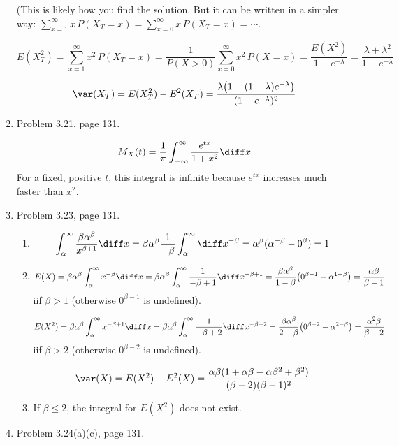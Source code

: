 \documentclass[12pt]{article}
\begin{document}
\begin{enumerate}
(This is likely how you find the solution.
But it can be written in a simpler way:
$\sum_{x=1}^{\infty} x\, P(X_T = x)
= \sum_{x=0}^{\infty} x\, P(X_T = x)
= \dotsb$.

\[
E(X_T^2)
= \sum_{x=1}^{\infty} x^2\, P(X_T = x)
= \frac{1}{P(X > 0)} \sum_{x=0}^{\infty} x^2\, P(X = x)
= \frac{E(X^2)}{1 - e^{-\lambda}}
= \frac{\lambda + \lambda^2}{1 - e^{-\lambda}}
\]

\[
\var(X_T)
= E(X_T^2) - E^2(X_T)
= \frac{\lambda\bigl(1 - (1 + \lambda)e^{-\lambda}\bigr)}
    {(1 - e^{-\lambda})^2}
\]

\item Problem 3.21, page 131.

\[
M_X(t)
= \frac{1}{\pi}
    \int_{-\infty}^{\infty} \frac{e^{tx}}{1 + x^2}
    \diff x
\]
For a fixed, positive $t$, this integral is infinite because
$e^{tx}$ increases much faster than $x^2$.

\item Problem 3.23, page 131.
\begin{enumerate}
\item
\[
\int_{\alpha}^{\infty} \frac{\beta \alpha^\beta}{x^{\beta+1}} \diff x
= \beta \alpha^\beta \frac{1}{-\beta} \int_{\alpha}^{\infty}
    \diff x^{-\beta}
= \alpha^\beta (\alpha^{-\beta} - 0^\beta)
= 1
\]
\item
\[
E(X)
= \beta \alpha^{\beta} \int_{\alpha}^{\infty} x^{-\beta} \diff x
= \beta \alpha^{\beta} \int_{\alpha}^{\infty} \frac{1}{-\beta + 1}
    \diff x^{-\beta + 1}
= \frac{\beta \alpha^{\beta}}{1 - \beta}
    \bigl(0^{\beta - 1} - \alpha^{1-\beta}\bigr)
= \frac{\alpha\beta}{\beta - 1}
\]
iif $\beta > 1$ (otherwise $0^{\beta - 1}$ is undefined).

\[
E(X^2)
= \beta \alpha^{\beta} \int_{\alpha}^{\infty} x^{-\beta+1} \diff x
= \beta \alpha^{\beta} \int_{\alpha}^{\infty} \frac{1}{-\beta + 2}
    \diff x^{-\beta + 2}
= \frac{\beta \alpha^{\beta}}{2 - \beta}
    \bigl(0^{\beta - 2} - \alpha^{2-\beta}\bigr)
= \frac{\alpha^2\beta}{\beta - 2}
\]
iif $\beta > 2$ (otherwise $0^{\beta - 2}$ is undefined).

\[
\var(X)
= E(X^2) - E^2(X)
= \frac{\alpha\beta (1 + \alpha\beta - \alpha\beta^2 + \beta^2)}
    {(\beta - 2) (\beta - 1)^2}
\]

\item
If $\beta \le 2$, the integral for $E(X^2)$ does not exist.
\end{enumerate}

\item Problem 3.24(a)(c), page 131.


\end{enumerate}
\end{document}
